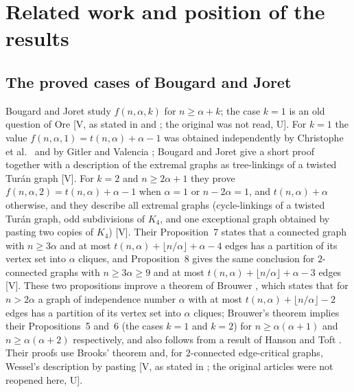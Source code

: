 \section{Related work and position of the results}\label{sec:related}

\subsection{The proved cases of Bougard and Joret}\label{sec:rel-bj}

Bougard and Joret \cite{BJ} study $f(n,\alpha,k)$ for $n\ge\alpha+k$; the case $k=1$ is an old question of Ore \cite{Ore} [V, as stated in \cite{BJ} and \cite{DG}; the original was not read, U].
For $k=1$ the value $f(n,\alpha,1)=t(n,\alpha)+\alpha-1$ was obtained independently by Christophe et al.\ \cite{Graphedron} and by Gitler and Valencia \cite{GitlerValencia}; Bougard and Joret give a short proof together with a description of the extremal graphs as tree-linkings of a twisted Tur\'an graph [V].
For $k=2$ and $n\ge2\alpha+1$ they prove $f(n,\alpha,2)=t(n,\alpha)+\alpha-1$ when $\alpha=1$ or $n-2\alpha=1$, and $t(n,\alpha)+\alpha$ otherwise, and they describe all extremal graphs (cycle-linkings of a twisted Tur\'an graph, odd subdivisions of $K_4$, and one exceptional graph obtained by pasting two copies of $K_4$) [V].
Their Proposition~7 states that a connected graph with $n\ge3\alpha$ and at most $t(n,\alpha)+\lfloor n/\alpha\rfloor+\alpha-4$ edges has a partition of its vertex set into $\alpha$ cliques, and Proposition~8 gives the same conclusion for $2$-connected graphs with $n\ge3\alpha\ge9$ and at most $t(n,\alpha)+\lfloor n/\alpha\rfloor+\alpha-3$ edges [V].
These two propositions improve a theorem of Brouwer \cite{Brouwer}, which states that for $n>2\alpha$ a graph of independence number $\alpha$ with at most $t(n,\alpha)+\lfloor n/\alpha\rfloor-2$ edges has a partition of its vertex set into $\alpha$ cliques; Brouwer's theorem implies their Propositions~5 and~6 (the cases $k=1$ and $k=2$) for $n\ge\alpha(\alpha+1)$ and $n\ge\alpha(\alpha+2)$ respectively, and also follows from a result of Hanson and Toft \cite{HansonToft}.
Their proofs use Brooks' theorem \cite{Brooks} and, for $2$-connected edge-critical graphs, Wessel's description by pasting \cite{Wessel} [V, as stated in \cite{BJ}; the original articles were not reopened here, U].

